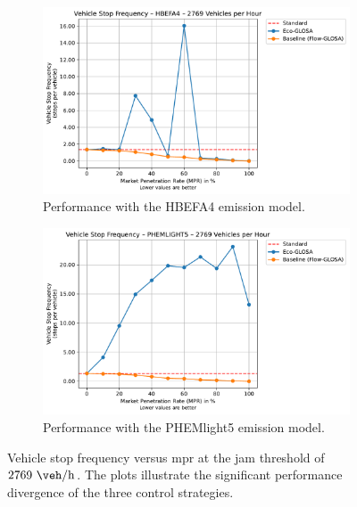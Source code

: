 \begin{figure}[htb]
  \centering
  \begin{subfigure}[b]{0.45\textwidth}
    \includegraphics[width=\textwidth]{data/img/VehicleStopFrequency/VehicleStopFrequency_HBEFA4_Cars2769.pdf}
    \caption{Performance with the HBEFA4 emission model.}
    \label{fig:StopFreq_2769_HBEFA4}
  \end{subfigure}\hfill
  \begin{subfigure}[b]{0.45\textwidth}
    \includegraphics[width=\textwidth]{data/img/VehicleStopFrequency/VehicleStopFrequency_PHEMLIGHT5_Cars2769.pdf}
    \caption{Performance with the PHEMlight5 emission model.}
    \label{fig:StopFreq_2769_PHEM}
  \end{subfigure}
  \caption[Vehicle stop frequency vs. \ac{mpr} at $2769~\unit{\veh\per\hour}$]{Vehicle stop frequency versus \ac{mpr} at the jam threshold of $2769~\unit{\veh\per\hour}$. The plots illustrate the significant performance divergence of the three control strategies.}
  \label{fig:StopFreq_2769}
\end{figure}

